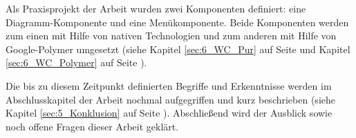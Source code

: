 Als Praxisprojekt der Arbeit wurden zwei Komponenten definiert: eine Diagramm-Komponente und eine Menükomponente. Beide Komponenten werden zum einen mit Hilfe von nativen Technologien und zum anderen mit Hilfe von Google-Polymer umgesetzt (siehe Kapitel \ref{sec:6_WC_Pur} auf Seite \pageref{sec:6_WC_Pur} und Kapitel \ref{sec:6_WC_Polymer} auf Seite \pageref{sec:6_WC_Polymer}).

Die bis zu diesem Zeitpunkt definierten Begriffe und Erkenntnisse werden im Abschlusskapitel der Arbeit nochmal aufgegriffen und kurz beschrieben (siehe Kapitel \ref{sec:5_Konklusion} auf Seite \pageref{sec:5_Konklusion}). Abschließend wird der Ausblick sowie noch offene Fragen dieser Arbeit geklärt.